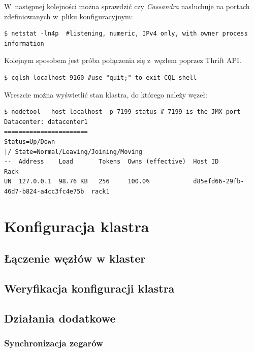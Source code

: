 \documentclass{article} %
\begin{document}
W~następnej kolejności można sprawdzić czy \emph{Cassandra} nasłuchuje na portach zdefiniowanych w~pliku konfiguracyjnym:

\begin{lstlisting}[style=bash, caption={sprawdzanie na których portach nasłuchuje \emph{Cassandra}}]
$ netstat -ln4p  #listening, numeric, IPv4 only, with owner process information
\end{lstlisting}

Kolejnym sposobem jest próba połączenia się z~węzłem poprzez Thrift API.

\begin{lstlisting}[style=bash, caption={dostęp do \emph{Cassandry} przez \emph{Thrift API}.}]
$ cqlsh localhost 9160 #use "quit;" to exit CQL shell
\end{lstlisting}

Wreszcie można wyświetlić stan klastra, do którego należy węzeł:

\begin{lstlisting}[style=bash, caption={sprawdzanie stanu klastra}]
$ nodetool --host localhost -p 7199 status # 7199 is the JMX port
Datacenter: datacenter1
=======================
Status=Up/Down
|/ State=Normal/Leaving/Joining/Moving
--  Address    Load       Tokens  Owns (effective)  Host ID                               Rack
UN  127.0.0.1  98.76 KB   256     100.0%            d85efd66-29fb-46d7-b824-a4cc3fc4e75b  rack1
\end{lstlisting}

\section{Konfiguracja klastra}

\subsection{Łączenie węzłów w klaster}

\subsection{Weryfikacja konfiguracji klastra}

\subsection{Działania dodatkowe}

\subsubsection{Synchronizacja zegarów}
\end{document}
